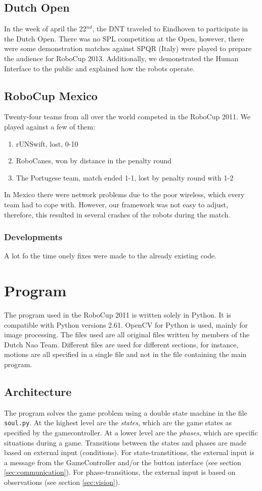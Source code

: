 \documentclass[a4paper]{article}
\begin{document}
\subsection{Dutch Open}
In the week of april the 22$^{nd}$, the DNT traveled to Eindhoven to participate in the Dutch Open. There was no SPL competition at the Open, however, there were some demonstration matches against SPQR (Italy) were played to prepare the audience for RoboCup 2013. Additionally, we demonstrated the Human Interface to the public and explained how the robots operate.

\subsection{RoboCup Mexico}
Twenty-four teams from all over the world competed in the RoboCup 2011. We played against a few of them:
\begin{enumerate}
\item rUNSwift, lost, 0-10
\item RoboCanes, won by distance in the penalty round
\item The Portugese team, match ended 1-1, lost by penalty round with 1-2
\end{enumerate}
In Mexico there were network problems due to the poor wireless, which every team had to cope with. However, our framework was not easy to adjust, therefore, this resulted in several crashes of the robots during the match.
\subsubsection{Developments}
A lot fo the time onely fixes were made to the already existing code.

\section{Program}
The program used in the RoboCup 2011 is written solely in Python. It is compatible with Python versions 2.61. OpenCV for Python is used, mainly for image processing. The files used are all original files written by members of the Dutch Nao Team. Different files are used for different sections, for instance, motions are all specified in a single file and not in the file containing the main program.
\subsection{Architecture}
\label{sec:architecture}
The program solves the game problem using a double state machine in the file \texttt{soul.py}. At the highest level are the \textit{states}, which are the game states as specified by the gamecontroller. 
At a lower level are the \textit{phases}, which are specific situations during a game. Transitions between the states and phases are made based on external input (conditions). 
For state-transtitions, the external input is a message from the GameController and/or the button interface (see section \ref{sec:communication}). 
For phase-transitions, the external input is based on observations (see section \ref{sec:vision}). 
\end{document}
